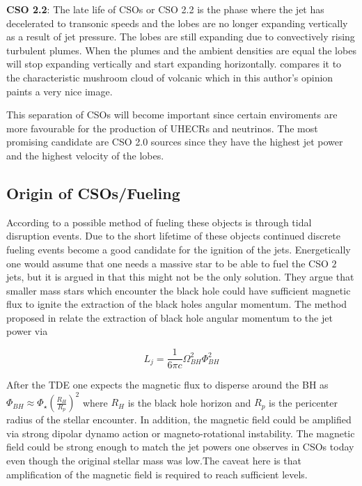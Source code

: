 \textbf{CSO 2.2}: The late life of CSOs or CSO 2.2 is the phase where the jet has decelerated to transonic speeds and the lobes are no longer expanding vertically as a result of jet pressure. The lobes are still expanding due to convectively rising turbulent plumes. When the plumes and the ambient densities are equal the lobes will stop expanding vertically and start expanding horizontally. \cite{sullivan2024smallscale} compares it to the characteristic mushroom cloud of volcanic which in this author's opinion paints a very nice image. 

This separation of CSOs will become important since certain enviroments are more favourable for the production of UHECRs and neutrinos. The most promising candidate are CSO 2.0 sources since they have the highest jet power and the highest velocity of the lobes. 

\subsection{Origin of CSOs/Fueling}
According to \cite{readhead2023compact} a possible method of fueling these objects is through tidal disruption events. Due to the short lifetime of these objects continued discrete fueling events become a good candidate for the ignition of the jets. Energetically one would assume that one needs a massive star to be able to fuel the CSO $2$ jets, but it is argued in \cite{sullivan2024smallscale} that this might not be the only solution. They argue that smaller mass stars which encounter the black hole could have sufficient magnetic flux to ignite the extraction of the black holes angular momentum. The method proposed in \cite{Blandford_1977} relate the extraction of black hole angular momentum  to the jet power via 

\begin{equation}
    L_j = \frac{1}{6\pi c} \Omega_{BH}^2 \Phi_{BH}^2
\end{equation}

After the TDE one expects the magnetic flux to disperse around the BH as $\Phi_{BH} \approx \Phi_{\star} \left(\frac{R_{H}}{R_{p}}\right)^2$ where $R_{H}$ is the black hole horizon and $R_{p}$ is the pericenter radius of the stellar encounter. In addition, the magnetic field could be amplified via strong dipolar dynamo action or magneto-rotational instability. The magnetic field could be strong enough to match the jet powers one observes in CSOs today even though the original stellar mass was low.The caveat here is that amplification of the magnetic field is required to reach sufficient levels.  


